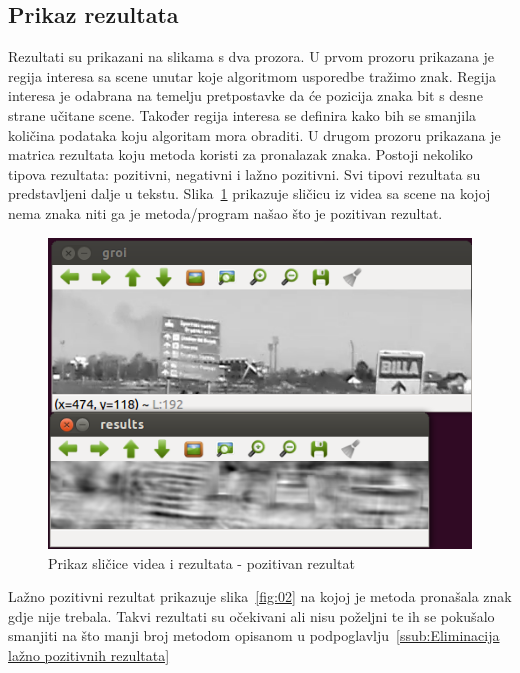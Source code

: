 \newpage
\subsection{Prikaz rezultata} %
\label{sub:Prikaz rezultata}

Rezultati su prikazani na slikama s dva prozora. U prvom prozoru
prikazana je regija interesa sa scene unutar koje algoritmom usporedbe
tražimo znak. Regija interesa je odabrana na temelju pretpostavke da će
pozicija znaka bit s desne strane učitane scene. Također regija interesa
se definira kako bih se smanjila količina podataka koju algoritam mora
obraditi. U drugom prozoru prikazana je matrica rezultata koju metoda
koristi za pronalazak znaka.  Postoji nekoliko tipova rezultata:
pozitivni, negativni i lažno pozitivni. Svi tipovi rezultata su
predstavljeni dalje u tekstu. Slika~\ref{fig:01} prikazuje sličicu iz
videa sa scene na kojoj nema znaka niti ga je metoda/program našao što
je pozitivan rezultat.

\begin{figure}[h]
\centering
\includegraphics[scale=0.5]{figures/01.png}
\caption{Prikaz sličice videa i rezultata - pozitivan rezultat}
\label{fig:01}
\end{figure}

Lažno pozitivni rezultat prikazuje slika~\ref{fig:02} na kojoj je metoda
pronašala znak gdje nije trebala. Takvi rezultati su očekivani ali nisu
poželjni te ih se pokušalo smanjiti na što manji broj metodom opisanom 
u podpoglavlju~\ref{ssub:Eliminacija lažno pozitivnih rezultata}

